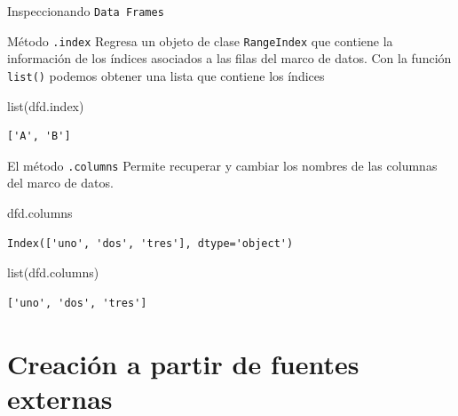 \documentclass[
  ignorenonframetext,
  aspectratio=169,
  spanish,
]{beamer}
\newenvironment{Shaded}{\begin{snugshade}}{\end{snugshade}}
\newcommand{\BuiltInTok}[1]{\textcolor[rgb]{0.00,0.23,0.31}{#1}}
\newcommand{\NormalTok}[1]{\textcolor[rgb]{0.00,0.23,0.31}{#1}}
\begin{document}
\begin{frame}[fragile]{Inspeccionando \texttt{Data\ Frames}}
\begin{block}{Método \texttt{.index}}
\label{muxe9todo-.index}
Regresa un objeto de clase \texttt{RangeIndex} que contiene la
información de los índices asociados a las filas del marco de datos. Con
la función \texttt{list()} podemos obtener una lista que contiene los
índices

\begin{Shaded}
\begin{Highlighting}[]
\BuiltInTok{list}\NormalTok{(dfd.index) }
\end{Highlighting}
\end{Shaded}

\begin{verbatim}
['A', 'B']
\end{verbatim}
\end{block}

\begin{block}{El método \texttt{.columns}}
\label{el-muxe9todo-.columns}
Permite recuperar y cambiar los nombres de las columnas del marco de
datos.

\begin{Shaded}
\begin{Highlighting}[]
\NormalTok{dfd.columns }
\end{Highlighting}
\end{Shaded}

\begin{verbatim}
Index(['uno', 'dos', 'tres'], dtype='object')
\end{verbatim}

\begin{Shaded}
\begin{Highlighting}[]
\BuiltInTok{list}\NormalTok{(dfd.columns) }
\end{Highlighting}
\end{Shaded}

\begin{verbatim}
['uno', 'dos', 'tres']
\end{verbatim}
\end{block}
\end{frame}

\section{Creación a partir de fuentes
externas}\label{creaciuxf3n-a-partir-de-fuentes-externas}
\end{document}
